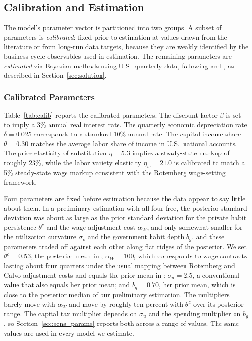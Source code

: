 \documentclass[article,11pt,letterpaper,fleqn]{article}
\theoremstyle{definition}
\numberwithin{equation}{section}
\begin{document}
\subsection{Calibration and Estimation}
\label{sec:calibration}

The model's parameter vector is partitioned into two groups. A subset of parameters is \emph{calibrated}: fixed prior to estimation at values drawn from the literature or from long-run data targets, because they are weakly identified by the business-cycle observables used in estimation. The remaining parameters are \emph{estimated} via Bayesian methods using U.S.\ quarterly data, following \citet{Zubairy2014} and \citet{SW2003}, as described in Section~\ref{sec:solution}.

\subsubsection{Calibrated Parameters}

Table~\ref{tab:calib} reports the calibrated parameters. The discount factor $\beta$ is set to imply a 3\% annual real interest rate. The quarterly economic depreciation rate $\delta = 0.025$ corresponds to a standard 10\% annual rate. The capital income share $\theta = 0.30$ matches the average labor share of income in U.S.\ national accounts. The price elasticity of substitution $\eta = 5.3$ implies a steady-state markup of roughly 23\%, while the labor variety elasticity $\eta_w = 21.0$ is calibrated to match a 5\% steady-state wage markup consistent with the Rotemberg wage-setting framework.

Four parameters are fixed before estimation because the data appear to say little about them. In a preliminary estimation with all four free, the posterior standard deviation was about as large as the prior standard deviation for the private habit persistence $\theta^c$ and the wage adjustment cost $\alpha_W$, and only somewhat smaller for the utilization curvature $\sigma_u$ and the government habit depth $b_g$, and these parameters traded off against each other along flat ridges of the posterior. We set $\theta^c = 0.53$, the posterior mean in \citet{Zubairy2014}; $\alpha_W = 100$, which corresponds to wage contracts lasting about four quarters under the usual mapping between Rotemberg and Calvo adjustment costs and equals the prior mean in \citet{Zubairy2014}; $\sigma_u = 2.5$, a conventional value that also equals her prior mean; and $b_g = 0.70$, her prior mean, which is close to the posterior median of our preliminary estimation. The multipliers barely move with $\alpha_W$ and move by roughly ten percent with $\theta^c$ over its posterior range. The capital tax multiplier depends on $\sigma_u$ and the spending multiplier on $b_g$, so Section~\ref{sec:sens_params} reports both across a range of values. The same values are used in every model we estimate.
\end{document}
